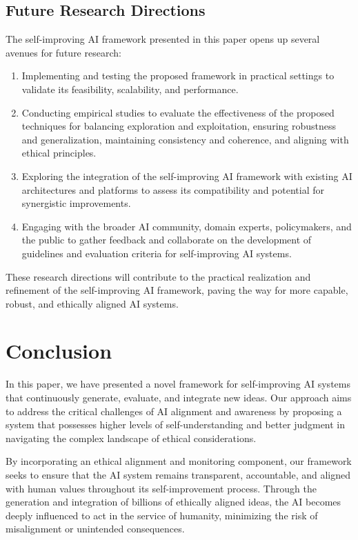 \documentclass[conference]{article}
\begin{document}
	\subsection{Future Research Directions}
	The self-improving AI framework presented in this paper opens up several avenues for future research:
	
	\begin{enumerate}
		\item Implementing and testing the proposed framework in practical settings to validate its feasibility, scalability, and performance.
		
		\item Conducting empirical studies to evaluate the effectiveness of the proposed techniques for balancing exploration and exploitation, ensuring robustness and generalization, maintaining consistency and coherence, and aligning with ethical principles.
		
		\item Exploring the integration of the self-improving AI framework with existing AI architectures and platforms to assess its compatibility and potential for synergistic improvements.
		
		\item Engaging with the broader AI community, domain experts, policymakers, and the public to gather feedback and collaborate on the development of guidelines and evaluation criteria for self-improving AI systems.
	\end{enumerate}
	
	These research directions will contribute to the practical realization and refinement of the self-improving AI framework, paving the way for more capable, robust, and ethically aligned AI systems.
	
	\section{Conclusion}
	
	In this paper, we have presented a novel framework for self-improving AI systems that continuously generate, evaluate, and integrate new ideas. Our approach aims to address the critical challenges of AI alignment and awareness by proposing a system that possesses higher levels of self-understanding and better judgment in navigating the complex landscape of ethical considerations.
	
	By incorporating an ethical alignment and monitoring component, our framework seeks to ensure that the AI system remains transparent, accountable, and aligned with human values throughout its self-improvement process. Through the generation and integration of billions of ethically aligned ideas, the AI becomes deeply influenced to act in the service of humanity, minimizing the risk of misalignment or unintended consequences.
	
\end{document}
